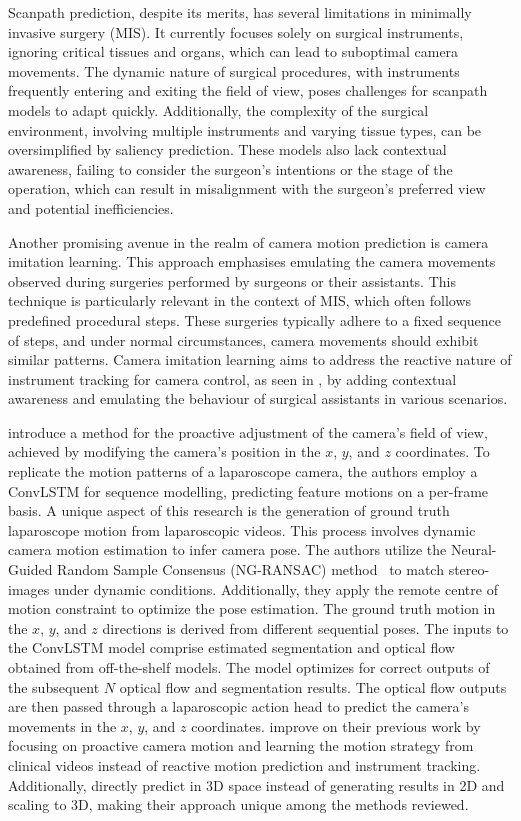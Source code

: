 Scanpath prediction, despite its merits, has several limitations in minimally invasive surgery (MIS). It currently focuses solely on surgical instruments, ignoring critical tissues and organs, which can lead to suboptimal camera movements. The dynamic nature of surgical procedures, with instruments frequently entering and exiting the field of view, poses challenges for scanpath models to adapt quickly. Additionally, the complexity of the surgical environment, involving multiple instruments and varying tissue types, can be oversimplified by saliency prediction. These models also lack contextual awareness, failing to consider the surgeon's intentions or the stage of the operation, which can result in misalignment with the surgeon's preferred view and potential inefficiencies.


Another promising avenue in the realm of camera motion prediction is camera imitation learning. This approach emphasises emulating the camera movements observed during surgeries performed by surgeons or their assistants. This technique is particularly relevant in the context of MIS, which often follows predefined procedural steps. These surgeries typically adhere to a fixed sequence of steps, and under normal circumstances, camera movements should exhibit similar patterns. Camera imitation learning aims to address the reactive nature of instrument tracking for camera control, as seen in \citet{li2021data,gruijthuijsen2022robotic}, by adding contextual awareness and emulating the behaviour of surgical assistants in various scenarios.


\citet{multi_fov} introduce a method for the proactive adjustment of the camera's field of view, achieved by modifying the camera's position in the $x$, $y$, and $z$ coordinates.  To replicate the motion patterns of a laparoscope camera, the authors employ a ConvLSTM for sequence modelling, predicting feature motions on a per-frame basis.
A unique aspect of this research is the generation of ground truth laparoscope motion from laparoscopic videos. This process involves dynamic camera motion estimation to infer camera pose.
The authors utilize the Neural-Guided Random Sample Consensus (NG-RANSAC) method~  \citep{brachmann2019neural} to match stereo-images under dynamic conditions.
Additionally, they apply the remote centre of motion constraint to optimize the pose estimation. The ground truth motion in the $x$, $y$, and $z$ directions is derived from different sequential poses.
The inputs to the ConvLSTM model comprise estimated segmentation and optical flow obtained from off-the-shelf models. The model optimizes for correct outputs of the subsequent $N$ optical flow and segmentation results. The optical flow outputs are then passed through a laparoscopic action head to predict the camera's movements in the $x$, $y$, and $z$ coordinates. \citet{multi_fov} improve on their previous work \citep{li2021data} by focusing on proactive camera motion and learning the motion strategy from clinical videos instead of reactive motion prediction and instrument tracking. Additionally, \citet{multi_fov} directly predict in 3D space instead of generating results in 2D and scaling to 3D, making their approach unique among the methods reviewed.


